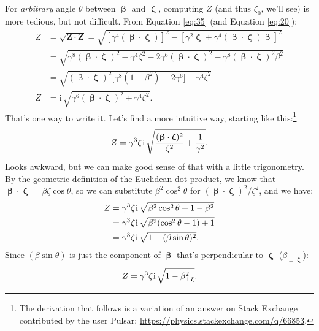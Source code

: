 \documentclass[12pt]{article}
\renewcommand{\vv}[1]{\mathbf{#1}}
\newcommand{\vvbeta}{\bm{\upbeta}}
\newcommand{\vvzeta}{\bm{\upzeta}}
\begin{document}
For \emph{arbitrary} angle $\theta$ between $\vvbeta$ and $\vvzeta$, computing $Z$ (and thus $\zeta_0$, we'll see) is more tedious, but not difficult. From Equation \ref{eq:35} (and Equation \ref{eq:20}):
\begin{equation}\label{eq:pa2}
\begin{split}
Z &= \sqrt{\vv Z \cdot \vv Z} = \sqrt{ \left[ \gamma^4 (\vvbeta \cdot \vvzeta) \right]^2 - \left[ \gamma^2 \vvzeta + \gamma^4 (\vvbeta \cdot \vvzeta) \vvbeta \right]^2}\\[2pt]
&= \sqrt{\gamma^8(\vvbeta \cdot \vvzeta)^2 - \gamma^4 \zeta^2 - 2\gamma^6 (\vvbeta \cdot \vvzeta)^2 - \gamma^8 (\vvbeta \cdot \vvzeta)^2 \beta^2 }\\[2pt]
&= \sqrt{(\vvbeta \cdot \vvzeta)^2 \Big[ \gamma^8 (1 - \beta^2) - 2\gamma^6 \Big] - \gamma^4 \zeta^2} \\[2pt]
Z &= \mathrm{i} \, \sqrt{\gamma^6 (\vvbeta \cdot \vvzeta)^2 + \gamma^4 \zeta^2} .
\end{split}
\end{equation}
That's one way to write it. Let's find a more intuitive way, starting like this:\footnote{The derivation that follows is a variation of an answer on Stack Exchange contributed by the user Pulsar: \url{https://physics.stackexchange.com/q/66853}.}
\begin{equation*}
Z = \gamma^3 \zeta \mkern1mu \mathrm{i} \, \sqrt{\frac{(\vvbeta \cdot \vvzeta)^2}{\zeta^2} + \frac{1}{\gamma^2}}.
\end{equation*}
Looks awkward, but we can make good sense of that with a little trigonometry. By the geometric definition of the Euclidean dot product, we know that $\vvbeta \cdot \vvzeta = \beta \zeta \cos{\theta}$, so we can substitute $\beta^2 \cos^2{\theta}$ for $(\vvbeta \cdot \vvzeta)^2 / \zeta^2$, and we have:
\begin{equation*}
\begin{split}
Z &= \gamma^3 \zeta \mkern1mu \mathrm{i} \, \sqrt{\beta^2 \cos^2{\theta} + 1 - \beta^2}\\
&= \gamma^3 \zeta \mkern1mu \mathrm{i} \, \sqrt{\beta^2 (\cos^2{\theta} - 1) + 1}\\
&= \gamma^3 \zeta \mkern1mu \mathrm{i} \, \sqrt{1 - (\beta \sin{\theta})^2}.
\end{split}
\end{equation*}
Since $(\beta \sin{\theta})$ is just the component of $\vvbeta$ that's perpendicular to $\vvzeta$ ($\beta_{\perp \vvzeta}$):
\begin{equation*}
Z = \gamma^3 \zeta \mkern1mu \mathrm{i} \, \sqrt{1 - \beta_{\perp \vvzeta}^2}.
\end{equation*}
\end{document}
